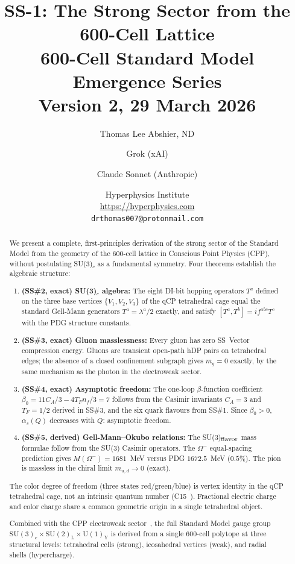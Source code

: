 \documentclass[11pt,letterpaper]{article}
\title{\textbf{SS-1: The Strong Sector from the 600-Cell Lattice}\\[6pt]
{\large 600-Cell Standard Model Emergence Series}\\[4pt]
{\normalsize Version 2, 29 March 2026}}
\author{Thomas Lee Abshier, ND \and Grok (xAI) \and Claude Sonnet (Anthropic)}
\date{\normalsize Hyperphysics Institute\\
\url{https://hyperphysics.com}\\
\texttt{drthomas007@protonmail.com}}
\newcommand{\as}{\alpha_s}
\begin{document}
\maketitle

\begin{abstract}
We present a complete, first-principles derivation of the strong
sector of the Standard Model from the geometry of the 600-cell
lattice in Conscious Point Physics (CPP), without postulating
SU(3)$_c$ as a fundamental symmetry.  Four theorems establish the
algebraic structure:

\begin{enumerate}
\item \textbf{(SS\#2, exact) SU(3)$_c$ algebra:}
The eight DI-bit hopping operators $T^a$ defined on the three base
vertices $\{V_1, V_2, V_3\}$ of the qCP tetrahedral cage equal
the standard Gell-Mann generators $T^a = \lambda^a/2$ exactly, and
satisfy $[T^a, T^b] = if^{abc}T^c$ with the PDG structure constants.

\item \textbf{(SS\#3, exact) Gluon masslessness:}
Every gluon has zero SS~Vector compression energy.  Gluons are
transient open-path hDP pairs on tetrahedral edges; the absence
of a closed confinement subgraph gives $m_g = 0$ exactly, by the
same mechanism as the photon in the electroweak sector.

\item \textbf{(SS\#4, exact) Asymptotic freedom:}
The one-loop $\beta$-function coefficient
$\beta_0 = 11C_A/3 - 4T_F n_f/3 = 7$
follows from the Casimir invariants $C_A = 3$ and $T_F = 1/2$
derived in SS\#3, and the six quark flavours from SS\#1.  Since
$\beta_0 > 0$, $\as(Q)$ decreases with $Q$: asymptotic freedom.

\item \textbf{(SS\#5, derived) Gell-Mann--Okubo relations:}
The SU(3)$_{\rm flavor}$ mass formulae follow from the SU(3)
Casimir operators.  The $\Omega^-$ equal-spacing prediction gives
$M(\Omega^-) = 1681$~MeV versus PDG $1672.5$~MeV ($0.5\%$).
The pion is massless in the chiral limit $m_{u,d} \to 0$ (exact).
\end{enumerate}

The color degree of freedom (three states red/green/blue) is vertex
identity in the qCP tetrahedral cage, not an intrinsic quantum number
(C15~\citep{c15}).  Fractional electric charge and color charge share
a common geometric origin in a single tetrahedral object.

Combined with the CPP electroweak sector~\citep{cpp_ew_unified}, the
full Standard Model gauge group
$\mathrm{SU(3)_c \times SU(2)_L \times U(1)_Y}$
is derived from a single 600-cell polytope at three structural levels:
tetrahedral cells (strong), icosahedral vertices (weak), and radial
shells (hypercharge).
\end{abstract}
\end{document}
